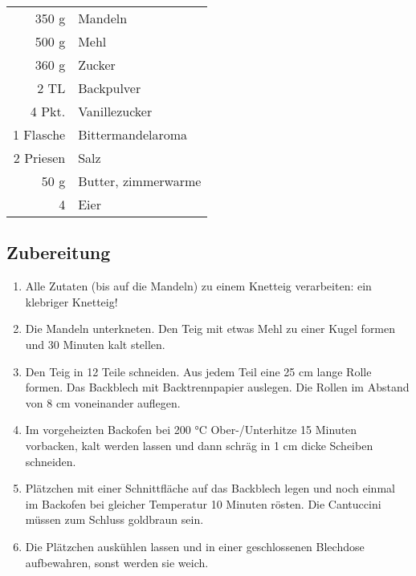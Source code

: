\begin {tabular}{r l}
    350 g & Mandeln \\
    500 g & Mehl \\
    360 g & Zucker \\
    2 TL & Backpulver \\
    4 Pkt. & Vanillezucker \\
    1 Flasche & Bittermandelaroma \\
    2 Priesen & Salz \\
    50 g & Butter, zimmerwarme \\
    4 & Eier
\end{tabular}
\subsection*{Zubereitung}
\begin{enumerate}
    \item  Alle Zutaten (bis auf die Mandeln) zu einem Knetteig verarbeiten: ein klebriger Knetteig!
    \item  Die Mandeln unterkneten. Den Teig mit etwas Mehl zu einer Kugel formen und 30 Minuten kalt stellen.
    \item  Den Teig in 12 Teile schneiden. Aus jedem Teil eine 25 cm lange Rolle formen. Das Backblech mit Backtrennpapier auslegen. Die Rollen im
    Abstand von 8 cm voneinander auflegen.
    \item  Im vorgeheizten Backofen bei 200 °C Ober-/Unterhitze 15 Minuten vorbacken, kalt werden lassen und dann schräg in 1 cm dicke
    Scheiben schneiden.
    \item  Plätzchen mit einer Schnittfläche auf das Backblech legen und noch einmal im Backofen bei gleicher Temperatur 10 Minuten rösten. Die Cantuccini müssen zum Schluss
    goldbraun sein.
    \item  Die Plätzchen auskühlen lassen und in einer geschlossenen Blechdose aufbewahren, sonst werden sie weich. 
\end{enumerate}
